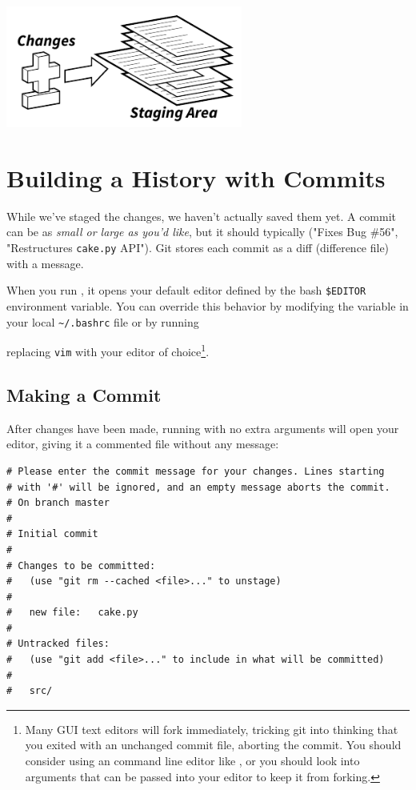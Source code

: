 \documentclass[11pt,letterpaper,twoside]{report}
\begin{document}
\vspace{\fill}
\begin{flushright}
\includegraphics[height=4cm]{resources/staging_abstract.pdf}

\end{flushright}
\vspace*{\fill}

\chapter{Building a History with Commits}

While we've staged the changes, we haven't actually saved them yet. A commit can
be as \emph{small or large as you'd like}, but it should typically
 ("Fixes Bug \#56", "Restructures
\texttt{cake.py} API"). Git stores each commit as a diff (difference file) with
a message.

When you run , it opens your default editor defined by the
bash \texttt{\$EDITOR} environment variable. You can override this behavior by
modifying the variable in your local \texttt{\textasciitilde/.bashrc} file or by
running


replacing \texttt{vim}
with your editor of choice\footnote{Many GUI text editors will fork immediately,
tricking git into thinking that you exited with an unchanged commit file,
aborting the commit. You should consider using an command line editor like
, or you should look into arguments that can be passed into your
editor to keep it from forking.}.

\section{Making a Commit}

After changes have been made, running  with no extra arguments
will open your editor, giving it a commented file without any message:

\begin{lstlisting}[numbers=none]
# Please enter the commit message for your changes. Lines starting
# with '#' will be ignored, and an empty message aborts the commit.
# On branch master
#
# Initial commit
#
# Changes to be committed:
#   (use "git rm --cached <file>..." to unstage)
#
#   new file:   cake.py
#
# Untracked files:
#   (use "git add <file>..." to include in what will be committed)
#
#   src/
\end{lstlisting}
\end{document}
